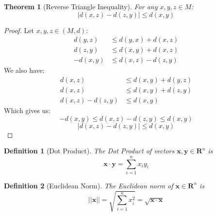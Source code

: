 \documentclass{article}
\newtheorem{definition}{Definition}[section]
\newtheorem{theorem}{Theorem}[section]
\begin{document}
			\begin{theorem}[Reverse Triangle Inequality]
			\label{reverse-triangle-inequality}
			For any $x, y, z \in M$:
			$$|d(x, z) - d(z, y)| \leq d(x, y)$$
			\end{theorem}
			\begin{proof}
				Let $x, y, z \in (M, d)$:
				\begin{align*}
					d(y, z) &\leq d(y, x) + d(x, z) \tag{Subadditivity}\\
					d(z, y) &\leq d(x, y) + d(x, z) \tag{Symmetry}\\
					-d(x, y) &\leq d(x, z) - d(z, y)
				\end{align*}
				We also have:
				\begin{align*}
					d(x, z) &\leq d(x, y) + d(y, z) \tag{Subadditivity}\\
					d(x, z) &\leq d(x, y) + d(z, y) \tag{Symmetry}\\
					d(x, z) - d(z, y) &\leq d(x, y)
				\end{align*}	
				Which gives us:
				$$-d(x, y) \leq d(x, z) - d(z, y) \leq d(x, y)$$
				$$|d(x, z) - d(z, y)| \leq d(x, y)$$
			\end{proof}

			\begin{definition}[Dot Product]
				The Dot Product of vectors $\bm{x}, \bm{y} \in \mathbf{R}^n$ is $$\bm{x} \cdot \bm{y} = \sum\limits_{i=1}^n x_i y_i$$
			\end{definition}

			\begin{definition}[Euclidean Norm]
				The Euclidean norm of $\bm{x} \in \mathbf{R}^n$ is $$||\bm{x}|| = \sqrt{\sum\limits_{i=1}^n x_i^2} = \sqrt{\bm{x} \cdot \bm{x}}$$
			\end{definition}
\end{document}
